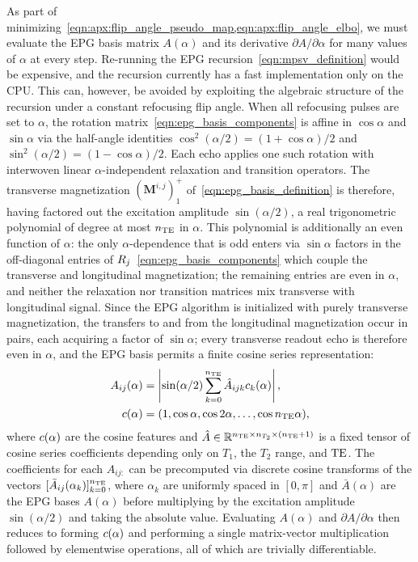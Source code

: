 As part of minimizing~\cref{eqn:apx:flip_angle_pseudo_map,eqn:apx:flip_angle_elbo}, we must evaluate the \gls*{EPG} basis matrix $A(\alpha)$ and its derivative $\partial A / \partial \alpha$ for many values of $\alpha$ at every step.
Re-running the \gls*{EPG} recursion~\eqref{eqn:mpsv_definition} would be expensive, and the recursion currently has a fast implementation only on the \gls*{CPU}.
This can, however, be avoided by exploiting the algebraic structure of the recursion under a constant refocusing flip angle.
When all refocusing pulses are set to $\alpha$, the rotation matrix~\eqref{eqn:epg_basis_components} is affine in $\cos\alpha$ and $\sin\alpha$ via the half-angle identities $\cos^2(\alpha/2) = (1 + \cos\alpha) / 2$ and $\sin^2(\alpha/2) = (1 - \cos\alpha) / 2$.
Each echo applies one such rotation with interwoven linear $\alpha$-independent relaxation and transition operators.
The transverse magnetization $(\mathbf{M}^{i,j})_1^+$ of~\eqref{eqn:epg_basis_definition} is therefore, having factored out the excitation amplitude $\sin(\alpha/2)$, a real trigonometric polynomial of degree at most $n_{\mathrm{TE}}$ in $\alpha$.
This polynomial is additionally an even function of $\alpha$:
the only $\alpha$-dependence that is odd enters via $\sin\alpha$ factors in the off-diagonal entries of $R_{j}$~\eqref{eqn:epg_basis_components} which couple the transverse and longitudinal magnetization;
the remaining entries are even in $\alpha$, and neither the relaxation nor transition matrices mix transverse with longitudinal signal.
Since the \gls*{EPG} algorithm is initialized with purely transverse magnetization, the transfers to and from the longitudinal magnetization occur in pairs, each acquiring a factor of $\sin\alpha$;
every transverse readout echo is therefore even in $\alpha$, and the \gls*{EPG} basis permits a finite cosine series representation:
\begin{align}\label{eqn:apx:epg_cosine_series}
    A_{ij}(\alpha) & = \left| \sin(\alpha / 2) \sum_{k=0}^{n_{\mathrm{TE}}} \hat{A}_{ijk} c_k(\alpha) \right|, \\
    c(\alpha)
                   & = (1, \cos\alpha, \cos 2\alpha, \ldots, \cos n_{\mathrm{TE}}\alpha), \nonumber
\end{align}
where $c(\alpha)$ are the cosine features and $\hat{A} \in \mathbb{R}^{n_{\mathrm{TE}} \times n_{T_2} \times (n_{\mathrm{TE}} + 1)}$ is a fixed tensor of cosine series coefficients depending only on $T_1$, the $T_2$ range, and $\mathrm{TE}$.
The coefficients for each $\hat{A}_{ij:}$ can be precomputed via discrete cosine transforms of the vectors $[\bar{A}_{ij}(\alpha_k)]_{k=0}^{n_{\mathrm{TE}}}$, where $\alpha_k$ are uniformly spaced in $[0, \pi]$ and $\bar{A}(\alpha)$ are the \gls*{EPG} bases $A(\alpha)$ before multiplying by the excitation amplitude $\sin(\alpha/2)$ and taking the absolute value.
Evaluating $A(\alpha)$ and $\partial A / \partial \alpha$ then reduces to forming $c(\alpha)$ and performing a single matrix-vector multiplication followed by elementwise operations, all of which are trivially differentiable.

